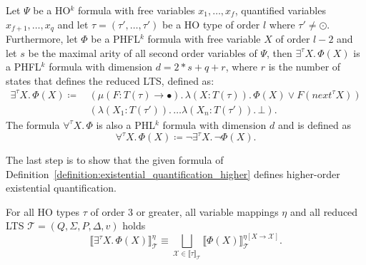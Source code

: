 \begin{definition}
    \label{definition:existential_quantification_higher}
    Let $\Psi$ be a HO$^k$ formula with free variables $x_1, \dots, x_f$, quantified variables $x_{f+1}, \dots,
    x_q$ and let $\tau = (\tau', \dots, \tau')$ be a HO type of order $l$ where $\tau' \neq \odot$. Furthermore, let
    $\Phi$ be a PHFL$^k$
    formula with free variable $X$ of order $l - 2$ and let $s$ be the maximal arity
    of all second order variables of $\Psi$, then $\exists^{\tau}X .\,\Phi(X)$
    is a PHFL$^k$ formula with dimension $d = 2 * s + q + r$, where $r$ is the number of states that defines the reduced LTS,  defined as:
    \begin{align*}
        \exists^{\tau}X.\, \Phi(X) \coloneqq &\,(\mu (F \colon T(\tau) \rightarrow \bullet).\, \lambda (X \colon T(\tau)
        ).\,
        \Phi(X)
        \vee F(next^\tau X))\\&\,(\lambda (X_1 \colon T(\tau')).\, \dots \lambda (X_n \colon T(\tau')).\,\bot).
    \end{align*}
    The formula $\forall^{\tau}X.\,\Phi$ is also a PHL$^k$ formula with dimension $d$ and is defined as
    \[\forall^{\tau}X.\,\Phi(X) \coloneqq \neg \exists^{\tau}X .\,\neg\Phi(X).\]
\end{definition}

The last step is to show that the given formula of Definition~\ref{definition:existential_quantification_higher} defines
higher-order existential quantification.

\begin{lemma}
    \label{lemma:existential_quantifier_higher}
    For all HO types $\tau$ of order $3$ or greater, all variable mappings $\eta$ and all reduced LTS $\mathcal{T} = (Q, \Sigma, P, \Delta, v)$ holds
    \[\llbracket \exists^\tau X.\,\Phi(X)\rrbracket^\eta_\mathcal{T} \equiv \underset{\mathcal{X} \in \llbracket \tau
    \rrbracket_\mathcal{T}}{\bigsqcup} \llbracket \Phi(X) \rrbracket^{\eta[X\rightarrow \mathcal{X}]}_\mathcal{T}.\]
\end{lemma}

